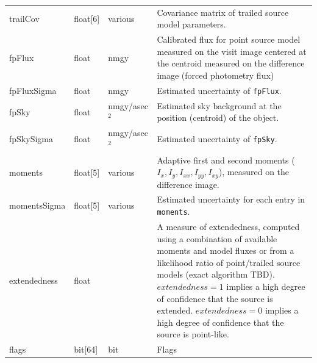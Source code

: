 \documentclass[12pt]{article}
\begin{document}
\begin{center}
\begin{longtable}{p{3cm}p{2cm}p{2cm}p{5cm}}
trailCov & float[6] & various & Covariance matrix of trailed source model
parameters. \\ 

fpFlux & float & nmgy & Calibrated flux for point source model measured on the
visit image centered at the centroid measured on the difference image (forced
photometry flux) \\ 

fpFluxSigma & float & nmgy & Estimated uncertainty of \texttt{fpFlux}. \\ 

fpSky & float & nmgy/asec$^{2}$ & Estimated sky background at the position
(centroid) of the object. \\ 

fpSkySigma & float & nmgy/asec$^{2}$ & Estimated uncertainty of
\texttt{fpSky}. \\ 



moments & float[5] & various & Adaptive first and second moments ($I_{x},
I_{y}, I_{xx}, I_{yy}, I_{xy}$), measured on the difference image. \\ 

momentsSigma & float[5] & various & Estimated uncertainty for each entry in
\texttt{moments}. \\ 

extendedness & float & ~ & A measure of extendedness, computed using a
combination of available moments and model fluxes or from a likelihood ratio
of point/trailed source models (exact algorithm TBD). $extendedness=1$ implies
a high degree of confidence that the source is extended. $extendedness=0$
implies a high degree of confidence that the source is point-like. \\

flags & bit[64] & bit & Flags \\ \hline
\end{longtable}
\end{center}
\end{document}
